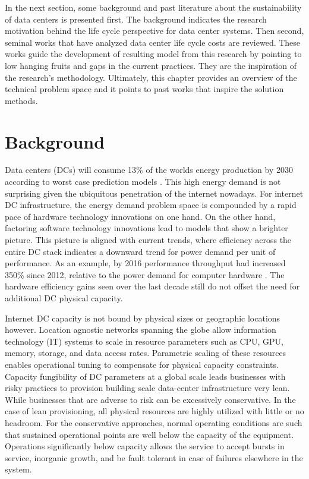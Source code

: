     In the next section, some background and past literature about the sustainability of data centers is presented first. The background indicates the research motivation behind the life cycle perspective for data center systems. Then second, seminal works that have analyzed data center life cycle costs are reviewed. These works guide the development of resulting model from this research by pointing to low hanging fruits and gaps in the current practices. They are the inspiration of the research's methodology. Ultimately, this chapter provides an overview of the technical problem space and it points to past works that inspire the solution methods.

\section{Background}

    Data centers (DCs) will consume 13\% of the worlds energy production by 2030 according to worst case prediction models \cite{andrae15}. This high energy demand is not surprising given the ubiquitous penetration of the internet nowadays. For internet DC infrastructure, the energy demand problem space is compounded by a rapid pace of hardware technology innovations on one hand. On the other hand, factoring software technology innovations lead to models that show a brighter picture. This picture is aligned with current trends, where efficiency across the entire DC stack indicates a downward trend for power demand per unit of performance. As an example, by 2016 performance throughput had increased 350\% since 2012, relative to the power demand for computer hardware \cite{GoogleEnvRpt}.  The hardware efficiency gains seen over the last decade still do not offset the need for additional DC physical capacity.
    
    Internet DC capacity is not bound by physical sizes or geographic locations however. Location agnostic networks spanning the globe allow information technology (IT) systems to scale in resource parameters such as CPU, GPU, memory, storage, and data access rates. Parametric scaling of these resources enables operational tuning to compensate for physical capacity constraints. Capacity fungibility of DC parameters at a global scale leads businesses with risky practices to provision building scale data-center infrastructure very lean. While businesses that are adverse to risk can be excessively conservative. In the case of lean provisioning, all physical resources are highly utilized with little or no headroom. For the conservative approaches, normal operating conditions are such that sustained operational points are well below the capacity of the equipment. Operations significantly below capacity allows the service to accept bursts in service, inorganic  growth, and be fault tolerant in case of failures elsewhere in the system. 
    
